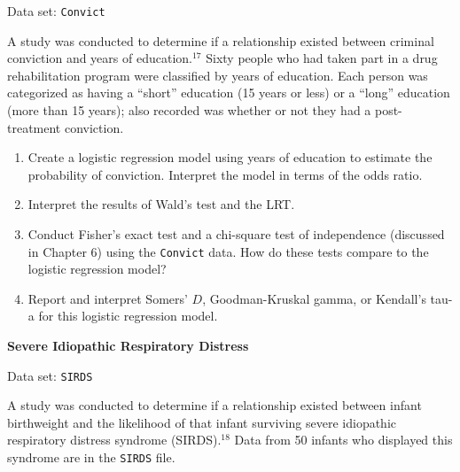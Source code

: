 \documentclass[
]{report}
\begin{document}
\begin{list}{E..}{ \setlength{\itemsep}{1.2em}}
Data set: \texttt{Convict}

A study was conducted to determine if a relationship existed between criminal conviction and years of education.$^{17}$ Sixty people who had taken part in a drug rehabilitation program were classified by years of education. Each person was categorized as having a “short” education (15 years or less) or a “long” education (more than 15 years); also recorded was whether or not they had a post-treatment conviction.

  \begin{enumerate}
    \item Create a logistic regression model using years of education to estimate the probability of conviction. Interpret the model in terms of the odds ratio.
    \item Interpret the results of Wald’s test and the LRT.
    \item Conduct Fisher’s exact test and a chi-square test of independence (discussed in Chapter 6) using the \texttt{Convict} data. How do these tests compare to the logistic regression model?
    \item Report and interpret Somers’ $D$, Goodman-Kruskal gamma, or Kendall’s tau-a for this logistic regression model.
  \end{enumerate}

  \item \textbf{Severe Idiopathic Respiratory Distress}

Data set: \texttt{SIRDS}

A study was conducted to determine if a relationship existed between infant birthweight and the likelihood of that infant surviving severe idiopathic respiratory distress syndrome (SIRDS).$^{18}$ Data from 50 infants who displayed this syndrome are in the \texttt{SIRDS} file.


\end{list}
\end{document}
